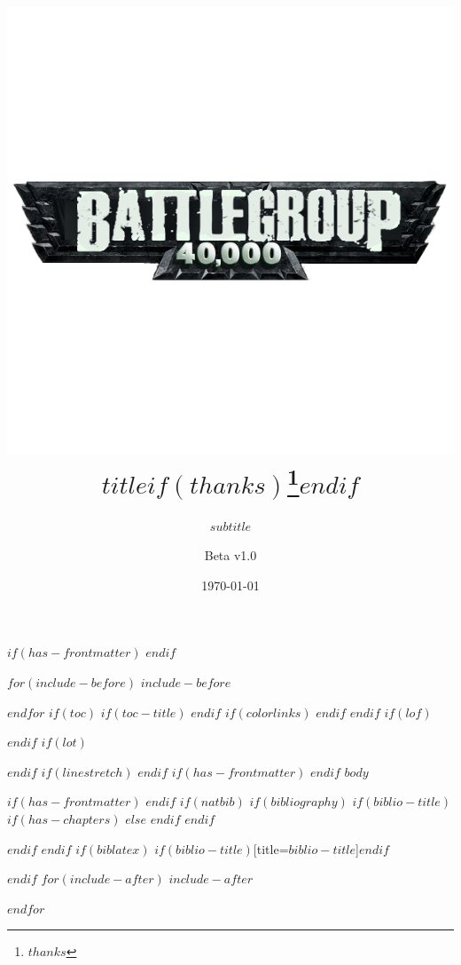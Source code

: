 \documentclass[letterpaper,twocolumn,oneside,titlepage]{book}
\title{
    \includegraphics[width=\textwidth]{img/style/bg40klogo.png}\\
}
\title{$title$$if(thanks)$\thanks{$thanks$}$endif$}
\subtitle{$subtitle$}
\author{Beta v1.0}
\date{\today}
\begin{document}
$if(has-frontmatter)$
\frontmatter
$endif$
\maketitle

$for(include-before)$
$include-before$

$endfor$
$if(toc)$
$if(toc-title)$
\renewcommand*\contentsname{$toc-title$}
$endif$
{
$if(colorlinks)$
\hypersetup{linkcolor=$if(toccolor)$$toccolor$$else$$endif$}
$endif$
\setcounter{tocdepth}{$toc-depth$}
\tableofcontents
\cleardoublepage
}
$endif$
$if(lof)$
\listoffigures
$endif$
$if(lot)$
\listoftables
$endif$
$if(linestretch)$
$endif$
$if(has-frontmatter)$
\mainmatter
$endif$
$body$

$if(has-frontmatter)$
\backmatter
$endif$
$if(natbib)$
$if(bibliography)$
$if(biblio-title)$
$if(has-chapters)$
\renewcommand\bibname{$biblio-title$}
$else$
\renewcommand\refname{$biblio-title$}
$endif$
$endif$


$endif$
$endif$
$if(biblatex)$
\printbibliography$if(biblio-title)$[title=$biblio-title$]$endif$

$endif$
$for(include-after)$
$include-after$

$endfor$
\end{document}
